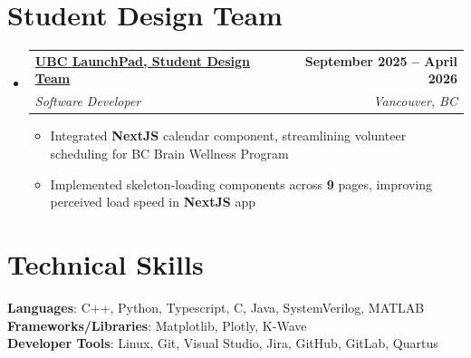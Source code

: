 \documentclass[letterpaper,11pt]{article}
\makeatletter
\newcommand{\resumeItem}[1]{
  \item\small{
    {#1 \vspace{-2pt}}
  }
}
\newcommand{\resumeSubheading}[4]{
  \vspace{-2pt}\item
    \begin{tabular*}{1.0\textwidth}[t]{l@{\extracolsep{\fill}}r}
      \textbf{#1} & \textbf{\small #2} \\
      \textit{\small#3} & \textit{\small #4} \\
    \end{tabular*}\vspace{-7pt}
}
\newcommand{\resumeSubHeadingListStart}{\begin{itemize}[leftmargin=0.0in, label={}]}
\newcommand{\resumeSubHeadingListEnd}{\end{itemize}}
\newcommand{\resumeItemListStart}{\begin{itemize}}
\newcommand{\resumeItemListEnd}{\end{itemize}\vspace{-5pt}}
\makeatother
\begin{document}





\vspace{-15pt}
 \section{Student Design Team}
    \resumeSubHeadingListStart
 \resumeSubheading
        {\href{https://github.com/ubclaunchpad/ubc-degree-navigator}
          {UBC LaunchPad\textnormal{, Student Design Team}}}{September 2025 -- April 2026}
          {Software Developer
          } {Vancouver, BC}
          \resumeItemListStart
            \resumeItem{Integrated \textbf{NextJS} calendar component, streamlining volunteer scheduling for BC Brain Wellness Program}
             \resumeItem{Implemented skeleton-loading components across \textbf{9} pages, improving perceived load speed in \textbf{NextJS} app}
          \resumeItemListEnd
      \resumeSubHeadingListEnd

\vspace{-16pt}
\section{Technical Skills}
\begin{itemize}[leftmargin=0.15in, label={}]
    \small{\item{
     \textbf{Languages}{: C++, Python, Typescript, C, Java, SystemVerilog, MATLAB } \\
     \textbf{Frameworks/Libraries}{: Matplotlib, Plotly, K-Wave } \\
     \textbf{Developer Tools}{: Linux, Git, Visual Studio, Jira, GitHub, GitLab, Quartus } \\
    }}
\end{itemize}
\end{document}
